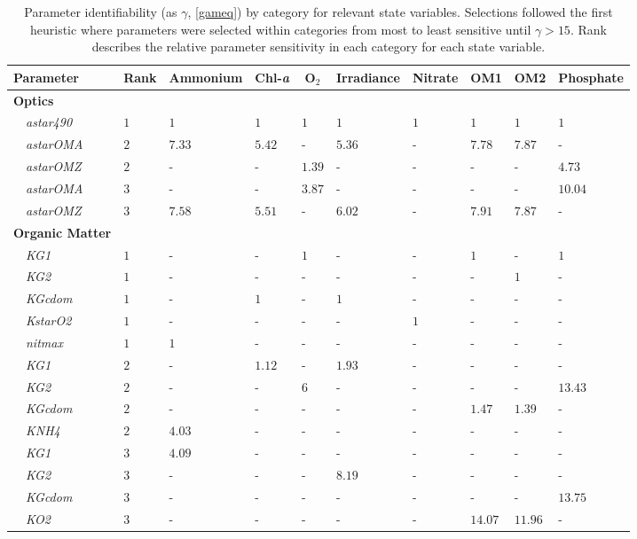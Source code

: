 \documentclass[letterpaper,12pt,oneside]{article}\usepackage[]{graphicx}\usepackage[]{color}
\begin{document}
\begin{table}[!tbp]
{\scriptsize
\caption{Parameter identifiability (as $\gamma$, \cref{gameq}) by category for relevant state variables.  Selections followed the first heuristic where parameters were selected within categories from most to least sensitive until $\gamma > 15$.  Rank describes the relative parameter sensitivity in each category for each state variable.\label{tab:heurist1}} 
\begin{center}
\begin{tabular}{llllllllll}
\hline\hline
\multicolumn{1}{l}{Parameter}&\multicolumn{1}{c}{Rank}&\multicolumn{1}{c}{Ammonium}&\multicolumn{1}{c}{Chl-\textit{a}}&\multicolumn{1}{c}{O$_2$}&\multicolumn{1}{c}{Irradiance}&\multicolumn{1}{c}{Nitrate}&\multicolumn{1}{c}{OM1}&\multicolumn{1}{c}{OM2}&\multicolumn{1}{c}{Phosphate}\tabularnewline
\hline
{\bfseries Optics}&&&&&&&&&\tabularnewline
~~\scriptsize{\textit{astar490}}&$1$&$1$&$1$&$1$&$1$&$1$&$1$&$1$&$1$\tabularnewline
~~\scriptsize{\textit{astarOMA}}&$2$&$7.33$&$5.42$&-&$5.36$&-&$7.78$&$7.87$&-\tabularnewline
~~\scriptsize{\textit{astarOMZ}}&$2$&-&-&$1.39$&-&-&-&-&$4.73$\tabularnewline
~~\scriptsize{\textit{astarOMA}}&$3$&-&-&$3.87$&-&-&-&-&$10.04$\tabularnewline
~~\scriptsize{\textit{astarOMZ}}&$3$&$7.58$&$5.51$&-&$6.02$&-&$7.91$&$7.87$&-\tabularnewline
\hline
{\bfseries Organic Matter}&&&&&&&&&\tabularnewline
~~\scriptsize{\textit{KG1}}&$1$&-&-&$1$&-&-&$1$&-&$1$\tabularnewline
~~\scriptsize{\textit{KG2}}&$1$&-&-&-&-&-&-&$1$&-\tabularnewline
~~\scriptsize{\textit{KGcdom}}&$1$&-&$1$&-&$1$&-&-&-&-\tabularnewline
~~\scriptsize{\textit{KstarO2}}&$1$&-&-&-&-&$1$&-&-&-\tabularnewline
~~\scriptsize{\textit{nitmax}}&$1$&$1$&-&-&-&-&-&-&-\tabularnewline
~~\scriptsize{\textit{KG1}}&$2$&-&$1.12$&-&$1.93$&-&-&-&-\tabularnewline
~~\scriptsize{\textit{KG2}}&$2$&-&-&$6$&-&-&-&-&$13.43$\tabularnewline
~~\scriptsize{\textit{KGcdom}}&$2$&-&-&-&-&-&$1.47$&$1.39$&-\tabularnewline
~~\scriptsize{\textit{KNH4}}&$2$&$4.03$&-&-&-&-&-&-&-\tabularnewline
~~\scriptsize{\textit{KG1}}&$3$&$4.09$&-&-&-&-&-&-&-\tabularnewline
~~\scriptsize{\textit{KG2}}&$3$&-&-&-&$8.19$&-&-&-&-\tabularnewline
~~\scriptsize{\textit{KGcdom}}&$3$&-&-&-&-&-&-&-&$13.75$\tabularnewline
~~\scriptsize{\textit{KO2}}&$3$&-&-&-&-&-&$14.07$&$11.96$&-\tabularnewline

\end{tabular}
\end{center}}
\end{table}
\end{document}
